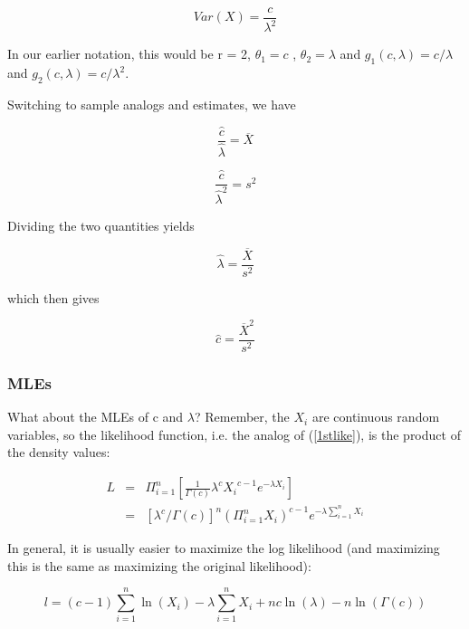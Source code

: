 \begin{equation}
Var(X) = \frac{c}{\lambda^2}
\end{equation}

In our earlier notation, this would be r = 2, $\theta_1 = c$ , $\theta_2
= \lambda$ and $g_1(c,\lambda) = c/\lambda$ and $g_2(c,\lambda) =
c/\lambda^2$.

Switching to sample analogs and estimates, we have

\begin{equation}
\frac{\widehat{c}}{\widehat{\lambda}} = \overline{X}
\end{equation}

\begin{equation}
\frac{\widehat{c}}{\widehat{\lambda} ^ 2} = s^2
\end{equation}

Dividing the two quantities yields

\begin{equation}
\widehat{\lambda} = \frac{\overline{X}}{s^2}
\end{equation}

which then gives

\begin{equation}
\widehat{c} = \frac{\overline{X}^2}{s^2}
\end{equation}

\subsubsection{MLEs}

What about the MLEs of c and $\lambda$?  Remember, the $X_i$ are
continuous random variables, so the likelihood function, i.e. the analog
of (\ref{1stlike}), is the product of the density values:

\begin{eqnarray}
L &=& 
   \Pi_{i=1}^n 
   \left [
   \frac{1}{\Gamma(c)} \lambda^c {X_i}^{c-1} e^{-\lambda {X_i}} 
   \right ] \\ 
&=& [\lambda^c/\Gamma(c)]^n 
\left ( \Pi_{i=1}^n X_i \right )^{c-1}
e^{-\lambda \sum_{i=1}^n X_i}
\end{eqnarray}

In general, it is usually easier to maximize the log likelihood
(and maximizing this is the same as maximizing the original likelihood):

\begin{equation}
\label{2ndlike}
l = (c-1) \sum_{i=1}^n \ln(X_i) - \lambda \sum_{i=1}^n X_i 
+ nc \ln(\lambda) - n \ln(\Gamma(c))
\end{equation}

